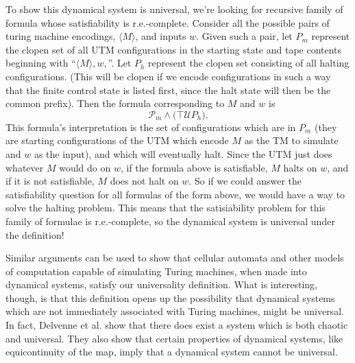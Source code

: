 \documentclass{fkpaper}
\newcommand{\ltil}{\mathcal{U}}
\newcommand{\psc}{\mathcal{P}}
\begin{document}
\begin{multicols}{2}
To show this dynamical system is universal, we're looking for recursive family of formula whose satisfiability is r.e.-complete. Consider all the possible pairs of turing machine encodings, $\langle M \rangle$, and inputs $w$. Given such a pair, let $P_m$ represent the clopen set of all UTM configurations in the starting state and tape contents beginning with ``$\langle M \rangle , w,$''. Let $P_{h}$ represent the clopen set consisting of all halting configurations. (This will be clopen if we encode configurations in such a way that the finite control state is listed first, since the halt state will then be the common prefix). Then the formula corresponding to $M$ and $w$ is $$ \psc_{m} \land \Big( \top \ltil P_{h} \Big).$$ This formula's interpretation is the set of configurations which are in $P_m$ (they are starting configurations of the UTM which encode $M$ as the TM to simulate and $w$ as the input), and which will eventually halt. Since the UTM just does whatever $M$ would do on $w$, if the formula above is satisfiable, $M$ halts on $w$, and if it is not satisfiable, $M$ does not halt on $w$. So if we could answer the satisfiability question for all formulas of the form above, we would have a way to solve the halting problem. This means that the satisiability problem for this family of formulae is r.e.-complete, so the dynamical system is universal under the definition!

Similar arguments can be used to show that cellular automata and other models of computation capable of simulating Turing machines, when made into dynamical systems, satisfy our universality definition. What is interesting, though, is that this definition opens up the possibility that dynamical systems which are not immediately associated with Turing machines, might be universal. In fact, Delvenne et al. show that there does exist a system which is both chaotic and universal. They also show that certain properties of dynamical systems, like equicontinuity of the map, imply that a dynamical system cannot be universal.








\end{multicols}
\end{document}
